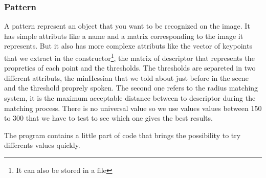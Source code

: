 \documentclass[english,a4paper,11pt]{report}
\begin{document}
	\subsubsection{Pattern}
	\par A pattern represent an object that you want to be recognized on the image. It has simple attributs like a name and a matrix corresponding to the image it represents. But it also has more complexe attributs like the vector of keypoints that we extract in the constructor\footnote{It can also be stored in a file}, the matrix of descriptor that represents the propreties of each point and the thresholds. The thresholds are separeted in two different attributs, the minHessian that we told about just before in the scene and the threshold proprely spoken. The second one refers to the radius matching system, it is the maximum acceptable distance between to descriptor during the matching process. There is no universal value so we use values values between 150 to 300 that we have to test to see which one gives the best results.
	\par The program contains a little part of code that brings the possibility to try differents values quickly.
	
	
	
	

	\listoffigures

	{}
	
	
\end{document}
